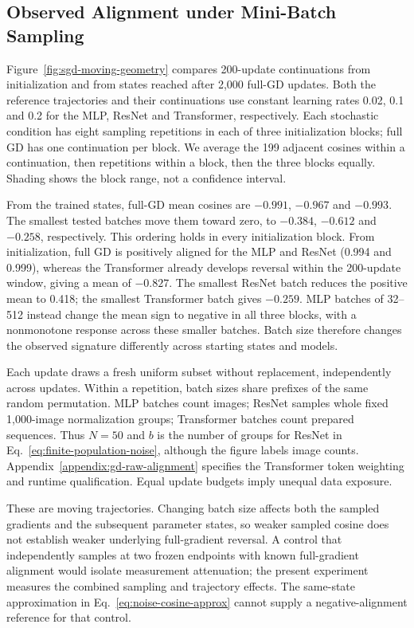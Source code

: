\subsection{Observed Alignment under Mini-Batch Sampling}
\label{sec:sgd-noise-experiments}

Figure~\ref{fig:sgd-moving-geometry} compares 200-update continuations
from initialization and from states reached after 2,000 full-GD updates.
Both the reference trajectories and their continuations use constant
learning rates 0.02, 0.1 and 0.2 for the MLP, ResNet and Transformer,
respectively. Each stochastic condition has eight sampling repetitions
in each of three initialization blocks; full GD has one continuation
per block. We average the 199 adjacent cosines within a continuation,
then repetitions within a block, then the three blocks equally.
Shading shows the block range, not a confidence interval.

From the trained states, full-GD mean cosines are $-0.991$, $-0.967$
and $-0.993$. The smallest tested batches move them toward zero, to
$-0.384$, $-0.612$ and $-0.258$, respectively. This ordering holds
in every initialization block. From initialization, full GD is
positively aligned for the MLP and ResNet (0.994 and 0.999), whereas
the Transformer already develops reversal within the 200-update
window, giving a mean of $-0.827$. The smallest ResNet batch reduces
the positive mean to 0.418; the smallest Transformer batch gives
$-0.259$. MLP batches of 32--512 instead change the mean sign to
negative in all three blocks, with a nonmonotone response across
these smaller batches. Batch size therefore changes the observed
signature differently across starting states and models.

Each update draws a fresh uniform subset without replacement,
independently across updates. Within a repetition, batch sizes share
prefixes of the same random permutation. MLP batches count images;
ResNet samples whole fixed 1,000-image normalization groups; Transformer
batches count prepared sequences. Thus $N=50$ and $b$ is the number
of groups for ResNet in Eq.~\eqref{eq:finite-population-noise}, although
the figure labels image counts. Appendix~\ref{appendix:gd-raw-alignment}
specifies the Transformer token weighting and runtime qualification.
Equal update budgets imply unequal data exposure.

These are moving trajectories. Changing batch size affects both the
sampled gradients and the subsequent parameter states, so weaker
sampled cosine does not establish weaker underlying full-gradient
reversal. A control that independently samples at two frozen endpoints
with known full-gradient alignment would isolate measurement attenuation;
the present experiment measures the combined sampling and trajectory
effects. The same-state approximation in
Eq.~\eqref{eq:noise-cosine-approx} cannot supply a negative-alignment
reference for that control.

